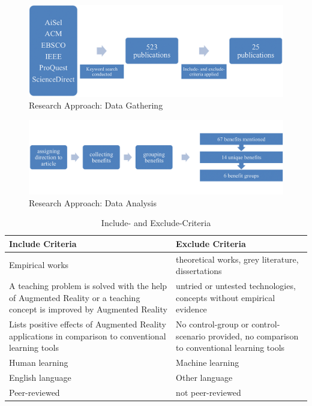 \begin{figure}[ptbh]
    \centering
    \includegraphics[width=\linewidth]{figures/research_approach_part_1.png}
    \caption[Research Approach: Data Gathering]{Research Approach: Data Gathering}
    \label{fig:ResearchApproachGathering}
\end{figure}

\begin{figure}[ptbh]
    \centering
    \includegraphics[width=\linewidth]{figures/research_approach_part_2.png}
    \caption[Research Approach: Data Analysis]{Research Approach: Data Analysis}
    \label{fig:ResearchApproachAnalysis}
\end{figure}

\begin{table}[ptbh]
    \center
    \vspace{1em}
    \begin{tabular}{p{17em} | p{17em}}
        \textbf{Include Criteria} & \textbf{Exclude Criteria} \\
        \hline
        Empirical works & theoretical works, grey literature, dissertations \\
        A teaching problem is solved with the help of Augmented Reality or a teaching concept is improved by Augmented Reality & untried or untested technologies, concepts without empirical evidence \\
        Lists positive effects of Augmented Reality applications in comparison to conventional learning tools & No control-group or control-scenario provided, no comparison to conventional learning tools \\
        Human learning & Machine learning \\
        English language & Other language \\
        Peer-reviewed & not peer-reviewed \\
    \end{tabular}
    \caption[Include- and Exclude-Criteria]{Include- and Exclude-Criteria}
    \label{tab:IncludeExcludeCriteria}
\end{table}

